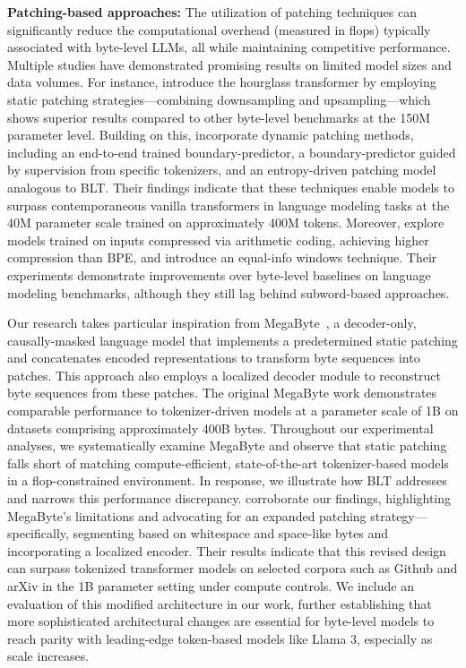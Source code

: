 \textbf{Patching-based approaches:} The utilization of patching techniques can significantly reduce the computational overhead (measured in flops) typically associated with byte-level LLMs, all while maintaining competitive performance. Multiple studies have demonstrated promising results on limited model sizes and data volumes. For instance, \cite{nawrot-etal-2022-hierarchical} introduce the hourglass transformer by employing static patching strategies—combining downsampling and upsampling—which shows superior results compared to other byte-level benchmarks at the 150M parameter level. Building on this, \cite{nawrot-etal-2023-efficient} incorporate dynamic patching methods, including an end-to-end trained boundary-predictor, a boundary-predictor guided by supervision from specific tokenizers, and an entropy-driven patching model analogous to {\textsc BLT}. Their findings indicate that these techniques enable models to surpass contemporaneous vanilla transformers in language modeling tasks at the 40M parameter scale trained on approximately 400M tokens. Moreover, \cite{lester2024training} explore models trained on inputs compressed via arithmetic coding, achieving higher compression than BPE, and introduce an equal-info windows technique. Their experiments demonstrate improvements over byte-level baselines on language modeling benchmarks, although they still lag behind subword-based approaches.

Our research takes particular inspiration from MegaByte~\citep{yu2023megabyte}, a decoder-only, causally-masked language model that implements a predetermined static patching and concatenates encoded representations to transform byte sequences into patches. This approach also employs a localized decoder module to reconstruct byte sequences from these patches. The original MegaByte work demonstrates comparable performance to tokenizer-driven models at a parameter scale of 1B on datasets comprising approximately 400B bytes. Throughout our experimental analyses, we systematically examine MegaByte and observe that static patching falls short of matching compute-efficient, state-of-the-art tokenizer-based models in a flop-constrained environment. In response, we illustrate how {\textsc BLT} addresses and narrows this performance discrepancy. \cite{slagle2024spacebyte} corroborate our findings, highlighting MegaByte’s limitations and advocating for an expanded patching strategy—specifically, segmenting based on whitespace and space-like bytes and incorporating a localized encoder. Their results indicate that this revised design can surpass tokenized transformer models on selected corpora such as Github and arXiv in the 1B parameter setting under compute controls. We include an evaluation of this modified architecture in our work, further establishing that more sophisticated architectural changes are essential for byte-level models to reach parity with leading-edge token-based models like Llama 3, especially as scale increases.

